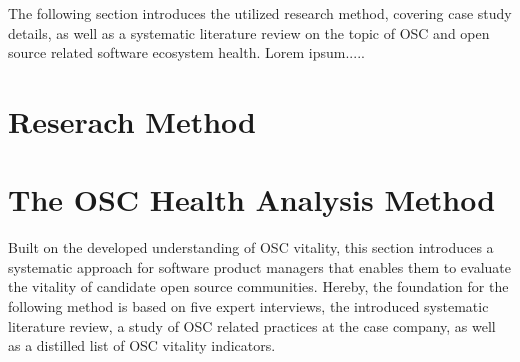 \documentclass[final,5p,times,twocolumn]{elsarticle}
\begin{document}
The following section introduces the utilized research method, covering case study details, as well as a systematic literature review on the topic of OSC and open source related software ecosystem health. Lorem ipsum.....
\section{Reserach Method}
\label{reserach_method_section}

\section{The OSC Health Analysis Method}
\label{OSC_method_section}
Built on the developed understanding of OSC vitality, this section introduces a systematic approach for software product managers that enables them to evaluate the vitality of candidate open source communities. Hereby, the foundation for the following method is based on five expert interviews, the introduced systematic literature review, a study of OSC related practices at the case company, as well as a distilled list of OSC vitality indicators.
\end{document}

